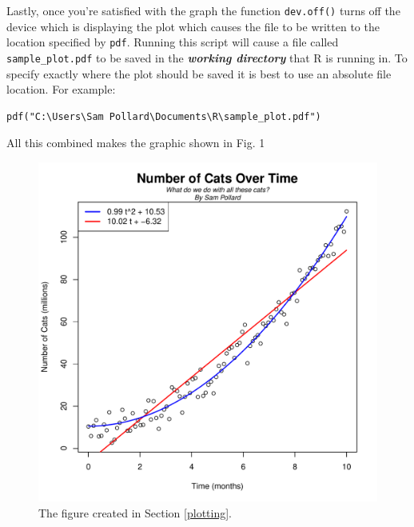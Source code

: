 \documentclass[12pt]{article}
\theoremstyle{remark}
\newcommand{\vocab}[1]{\textbf{\emph{#1}}}
\begin{document}
Lastly, once you're satisfied with the graph the function \verb|dev.off()| turns off the device which is displaying the plot which causes the file to be written to the location specified by \verb|pdf|. Running this script will cause a file called \verb|sample_plot.pdf| to be saved in the \vocab{working directory} that R is running in. To specify exactly where the plot should be saved it is best to use an absolute file location. For example:
\begin{verbatim}
pdf("C:\Users\Sam Pollard\Documents\R\sample_plot.pdf")
\end{verbatim}
All this combined makes the graphic shown in Fig. 1 

\begin{figure}[ht]
\centering
\includegraphics[scale=0.6]{sample_plot}
\caption{The figure created in Section \ref{plotting}.}
\label{quadratic}
\end{figure}

\end{document}
